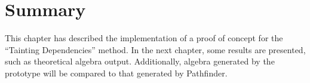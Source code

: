 







\section{Summary}
\label{sect:impl:summary}
This chapter has described the implementation of a proof of concept for the
``Tainting Dependencies'' method. In the next chapter, some results are
presented, such as theoretical algebra output. Additionally, algebra generated
by the prototype will be compared to that generated by Pathfinder.
